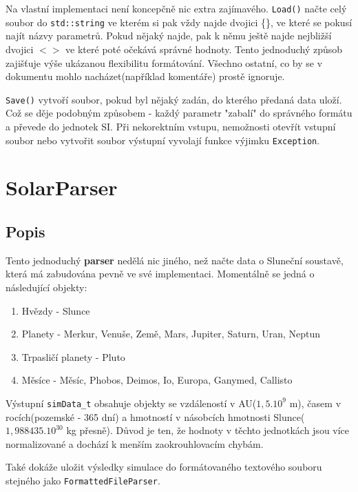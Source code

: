 Na vlastní implementaci není koncepčně nic extra zajímavého. \texttt{Load()} načte celý soubor do \texttt{std::string} ve kterém si pak vždy najde dvojici \{\}, ve které se pokusí najít názvy parametrů. Pokud nějaký najde, pak k němu ještě najde nejbližší dvojici $ <> $  ve které poté očekává správné hodnoty. Tento jednoduchý způsob zajišťuje výše ukázanou flexibilitu formátování. Všechno ostatní, co by se v dokumentu mohlo nacházet(například komentáře) prostě ignoruje. 

\texttt{Save()} vytvoří soubor, pokud byl nějaký zadán, do kterého předaná data uloží. Což se děje podobným způsobem - každý parametr "zabalí" do správného formátu a převede do jednotek SI.
Při nekorektním vstupu, nemožnosti otevřít vstupní soubor nebo vytvořit soubor výstupní vyvolají funkce výjimku \texttt{Exception}.


\chapter{SolarParser}
\section{Popis}
Tento jednoduchý \textbf{parser} nedělá nic jiného, než načte data o Sluneční soustavě, která má zabudována pevně ve své implementaci.
Momentálně se jedná o následující objekty:
\begin{enumerate}
	\item Hvězdy - Slunce
	\item Planety - Merkur, Venuše, Země, Mars, Jupiter, Saturn, Uran, Neptun
	\item Trpasličí planety - Pluto
	\item Měsíce - Měsíc, Phobos, Deimos, Io, Europa, Ganymed, Callisto
\end{enumerate}
Výstupní \texttt{simData\_t} obsahuje objekty se vzdáleností v AU($ 1,5.10^9 $ m), časem v rocích(pozemské - 365 dní) a hmotností v násobcích hmotnosti Slunce($ 1,988435.10^{30} $ kg přesně). Důvod je ten, že hodnoty v těchto jednotkách jsou více normalizované a dochází k menším zaokrouhlovacím chybám.

Také dokáže uložit výsledky simulace do formátovaného textového souboru stejného jako \texttt{FormattedFileParser}.